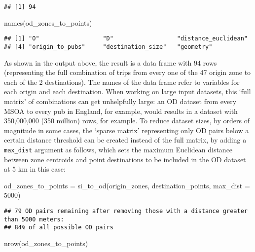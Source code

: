 \documentclass[11pt,letterpaper]{article}
\newenvironment{Shaded}{\begin{snugshade}}{\end{snugshade}}
\newcommand{\AttributeTok}[1]{\textcolor[rgb]{0.77,0.63,0.00}{#1}}
\newcommand{\DecValTok}[1]{\textcolor[rgb]{0.00,0.00,0.81}{#1}}
\newcommand{\FunctionTok}[1]{\textcolor[rgb]{0.00,0.00,0.00}{#1}}
\newcommand{\NormalTok}[1]{#1}
\newcommand{\OtherTok}[1]{\textcolor[rgb]{0.56,0.35,0.01}{#1}}
\begin{document}
\begin{verbatim}
## [1] 94
\end{verbatim}

\begin{Shaded}
\begin{Highlighting}[]
\FunctionTok{names}\NormalTok{(od\_zones\_to\_points)}
\end{Highlighting}
\end{Shaded}

\begin{verbatim}
## [1] "O"                  "D"                  "distance_euclidean"
## [4] "origin_to_pubs"     "destination_size"   "geometry"
\end{verbatim}

As shown in the output above, the result is a data frame with 94 rows (representing the full combination of trips from every one of the 47 origin zone to each of the 2 destinations).
The names of the data frame refer to variables for each origin and each destination.
When working on large input datasets, this `full matrix' of combinations can get unhelpfully large: an OD dataset from every MSOA to every pub in England, for example, would results in a dataset with 350,000,000 (350 million) rows, for example.
To reduce dataset sizes, by orders of magnitude in some cases, the `sparse matrix' representing only OD pairs below a certain distance threshold can be created instead of the full matrix, by adding a \texttt{max\_dist} argument as follows, which sets the maximum Euclidean distance between zone centroids and point destinations to be included in the OD dataset at 5 km in this case:

\begin{Shaded}
\begin{Highlighting}[]
\NormalTok{od\_zones\_to\_points }\OtherTok{=} \FunctionTok{si\_to\_od}\NormalTok{(origin\_zones, destination\_points, }\AttributeTok{max\_dist =} \DecValTok{5000}\NormalTok{)}
\end{Highlighting}
\end{Shaded}

\begin{verbatim}
## 79 OD pairs remaining after removing those with a distance greater than 5000 meters:
## 84% of all possible OD pairs
\end{verbatim}

\begin{Shaded}
\begin{Highlighting}[]
\FunctionTok{nrow}\NormalTok{(od\_zones\_to\_points)}
\end{Highlighting}
\end{Shaded}
\end{document}
